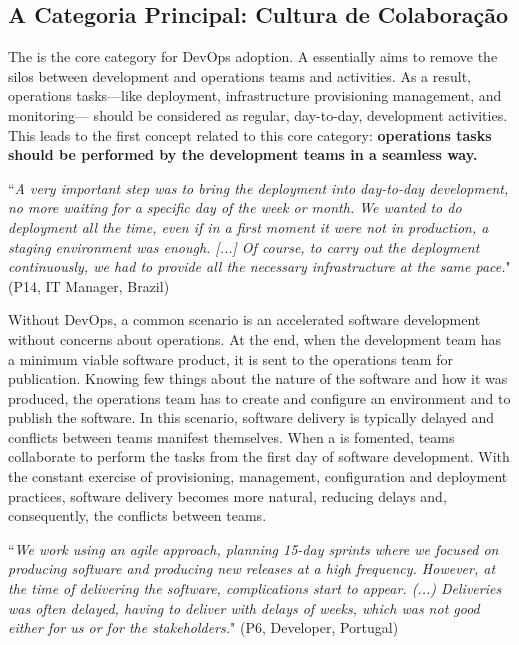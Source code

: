 \subsection{A Categoria Principal: Cultura de Colaboração}

The \cc is the core category
for DevOps adoption. A \cc essentially aims to remove
the silos between development and operations teams and activities.
As a result, operations tasks---like deployment, infrastructure provisioning
management, and monitoring--- should be considered as regular, day-to-day,
development activities. This leads to the first concept related to
this core category: {\bf operations tasks should be performed by
the development teams in a seamless way.}

\begin{mq}
``\emph{A very important step was to bring the deployment into day-to-day
development, no more waiting for a specific day of the week or month. We wanted
to do deployment all the time, even if in a first moment it were not in
production, a staging environment was enough. [...] Of course, to carry out the deployment
continuously, we had to provide all the necessary infrastructure at the same
pace.}" (P14, IT Manager, Brazil)
\end{mq}

Without DevOps, a common scenario is an accelerated software development
without concerns about operations. At the end, when the development team has a
minimum viable software product, it is sent to the operations team for
publication. Knowing few things about the nature of the software and how it
was produced, the operations team has to create and configure an environment
and to publish the software. In this scenario, software delivery is typically
delayed and conflicts between teams manifest themselves. When a \cc is fomented, teams collaborate to perform the tasks from the first day
of software development. With the constant exercise of provisioning, management,
configuration and deployment practices, software delivery becomes more natural,
reducing delays and, consequently, the conflicts between teams.

\begin{mq}
``\emph{We work using an agile approach, planning 15-day sprints where we focused on
producing software and producing new releases at a high frequency. However, at the time of
delivering the software, complications start to appear. (...) Deliveries was often delayed,
having to deliver with delays of weeks, which was not good either for us or for
the stakeholders.}" (P6, Developer, Portugal)
\end{mq}

